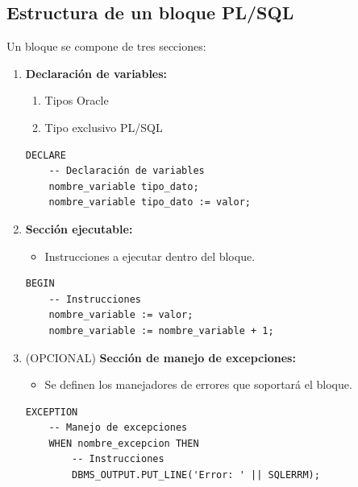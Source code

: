 \documentclass{templateNote}
\begin{document}
\subsection{Estructura de un bloque PL/SQL}
Un bloque se compone de tres secciones:
\begin{enumerate}
    \item \textbf{Declaración de variables:} \begin{enumerate}
        \item Tipos Oracle
        \item Tipo exclusivo PL/SQL
    \end{enumerate}
    \begin{tcolorbox}[
        colframe=Celeste!100, %
        colback=Celeste!20,       %
        coltitle=black!100, %
        title=\textbf{PL/SQL}, %
    ]
        \begin{verbatim}
DECLARE
    -- Declaración de variables
    nombre_variable tipo_dato;
    nombre_variable tipo_dato := valor;
        \end{verbatim}
    \end{tcolorbox}

    \newpage
    \item \textbf{Sección ejecutable:}
    \begin{itemize}
        \item Instrucciones a ejecutar dentro del bloque.
    \end{itemize}
    \begin{tcolorbox}[
        colframe=blue!100, %
        colback=blue!20,       %
        coltitle=white!100, %
        title=\textbf{PL/SQL}, %
    ]
    \begin{Verbatim}[breaklines=true]
BEGIN
    -- Instrucciones
    nombre_variable := valor;
    nombre_variable := nombre_variable + 1;
        \end{Verbatim}
    \end{tcolorbox}


    \item (OPCIONAL) \textbf{Sección de manejo de excepciones:}
    \begin{itemize}
        \item Se definen los manejadores de errores que soportará el bloque.
    \end{itemize}
    \begin{tcolorbox}[
        colframe=Morado!100, %
        colback=Morado!20,       %
        coltitle=white!100, %
        title=\textbf{PL/SQL}, %
    ]
    \begin{Verbatim}[breaklines=true]
EXCEPTION
    -- Manejo de excepciones
    WHEN nombre_excepcion THEN
        -- Instrucciones
        DBMS_OUTPUT.PUT_LINE('Error: ' || SQLERRM);
        \end{Verbatim}
    \end{tcolorbox}


\end{enumerate}
\end{document}
